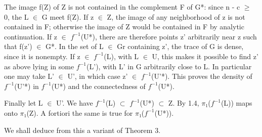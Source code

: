 \documentclass[10pt,a4paper]{article}
\begin{document}
\begin{adjustbox}{max totalsize={\textwidth}{0.945\textheight},center}
\begin{minipage}{\textwidth}
\noindent The image f(Z) of Z is not contained in the complement F of G*: since n - c \ensuremath{≥} 0, the L \ensuremath{∈} G meet f(Z). If z \ensuremath{∈} Z, the image of any neighborhood of z is not contained in F; otherwise the image of Z would be contained in F by analytic continuation. If z \ensuremath{∈} \ensuremath{f^{-1}}(U*), there are therefore points z' arbitrarily near z such that f(z') \ensuremath{∈} G*. In the set of L \ensuremath{∈} Gr containing z', the trace of G is dense, since it is nonempty. If z \ensuremath{∈} \ensuremath{f^{-1}}(L), with L \ensuremath{∈} U, this makes it possible to find z' as above lying in some \ensuremath{f^{-1}}(L'), with L' in G arbitrarily close to L. In particular one may take L' \ensuremath{∈} U', in which case z' \ensuremath{∈} \ensuremath{f^{-1}}(U'*). This proves the density of \ensuremath{f^{-1}}(U'*) in \ensuremath{f^{-1}}(U*) and the connectedness of \ensuremath{f^{-1}}(U*).\par\smallskip
\noindent Finally let L \ensuremath{∈} U'. We have \ensuremath{f^{-1}}(L) \ensuremath{⊂} \ensuremath{f^{-1}}(U*) \ensuremath{⊂} Z. By 1.4, \ensuremath{π₁}(\ensuremath{f^{-1}}(L)) maps onto \ensuremath{π₁}(Z). A fortiori the same is true for \ensuremath{π₁}(\ensuremath{f^{-1}}(U*)).\par\smallskip
\noindent We shall deduce from this a variant of Theorem 3.\par\smallskip
\end{minipage}
\end{adjustbox}
\newpage
\end{document}
